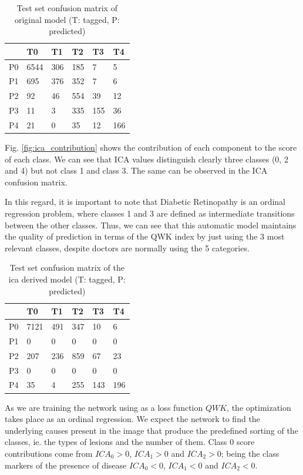 \documentclass[review]{elsarticle}
\theoremstyle{definition} %
\theoremstyle{remark}
\begin{document}
\begin{table}
	\centering
	\begin{tabular}{l|lllll}
		& T0 & T1 & T2 & T3 & T4 \\
		\hline
		P0 & 6544 & 306 & 185 &   7 &   5 \\
		P1 &  695 & 376 & 352 &   7 &   6 \\
		P2 &   92 &  46 & 554 &  39 &  12 \\
		P3 &   11 &   3 & 335 & 155 &  36 \\
		P4 &   21 &   0 &  35 &  12 & 166 \\
	\end{tabular}
	\caption{Test set confusion matrix of original model (T: tagged, P: predicted)}
	\label{tab:cm_orig}	
\end{table}

Fig. \ref{fig:ica_contribution} shows the contribution of each component to the score of each class. We can see that ICA values distinguish clearly three classes (0, 2 and 4) but not class 1 and class 3. The same can be observed in the ICA confusion matrix.

In this regard, it is important to note that Diabetic Retinopathy is an ordinal regression problem, where classes 1 and 3 are defined as intermediate transitions between the other classes. Thus, we can see that this automatic model maintains the quality of prediction in terms of the QWK index by just using the 3 most relevant classes, despite doctors are normally using the 5 categories.


\begin{table}
	\centering
	\begin{tabular}{l|lllll}
		& T0 & T1 & T2 & T3 & T4 \\
		\hline
		P0 & 7121 & 491 & 347 &  10 &   6 \\
		P1 &    0 &   0 &   0 &   0 &   0 \\
		P2 &  207 & 236 & 859 &  67 &  23 \\
		P3 &    0 &   0 &   0 &   0 &   0 \\
		P4 &   35 &   4 & 255 & 143 & 196 \\
	\end{tabular}
	\caption{Test set confusion matrix of the ica derived model (T: tagged, P: predicted)}
	\label{tab:cm_ica}	
\end{table}


As we are training the network using as a loss function $QWK$, the optimization takes place as an ordinal regression. We expect the network to find the underlying causes present in the image that produce the predefined sorting of the classes, ie. the types of lesions and the number of them. Class 0 score contributions come from $ICA_0 > 0$, $ICA_1 > 0$ and $ICA_2 > 0$; being the class markers of the presence of disease $ICA_0 < 0$, $ICA_1 < 0$ and $ICA_2 < 0$.
\end{document}
